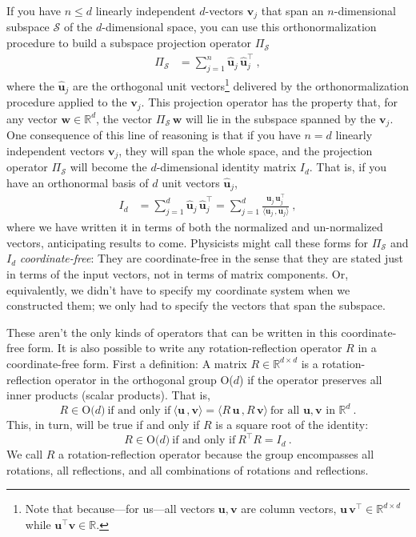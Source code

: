 \documentclass{article}
\newcommand{\Evec}[1]{{\mathbf{#1}}} %
\newcommand{\Ehat}[1]{{\mathbf{\hat{#1}}}} %
\newcommand{\inner}[2]{\langle{#1}\,,{#2}\rangle}
\begin{document}
If you have $n\leq d$ linearly independent $d$-vectors $\Evec{v}_j$ that span an $n$-dimensional subspace $\mathscr{S}$ of the $d$-dimensional space, you can use this orthonormalization procedure to build a subspace projection operator $\Pi_\mathscr{S}$
\begin{align}\label{eq:oproj}
    \Pi_\mathscr{S} &= \sum_{j=1}^n \Ehat{u}_j\,\Ehat{u}_j^\top ~,
\end{align}
where the $\Ehat{u}_j$ are the orthogonal unit vectors\footnote{Note that because---for us---all vectors $\Evec{u},\Evec{v}$ are column vectors, $\Evec{u}\,\Evec{v}^\top\in\mathbb{R}^{d\times d}$ while $\Evec{u}^\top \Evec{v}\in\mathbb{R}$.} delivered by the orthonormalization procedure applied to the $\Evec{v}_j$.
This projection operator has the property that, for any vector $\Evec{w}\in\mathbb{R}^d$, the vector $\Pi_\mathscr{S}\,\Evec{w}$ will lie in the subspace spanned by the $\Evec{v}_j$.
One consequence of this line of reasoning is that if you have $n=d$ linearly independent vectors $\Evec{v}_j$, they will span the whole space, and the projection operator $\Pi_\mathscr{S}$ will become the $d$-dimensional identity matrix $I_d$.
That is, if you have an orthonormal basis of $d$ unit vectors $\Ehat{u}_j$,
\begin{align}\label{eq:oI}
    I_d &= \sum_{j=1}^d \Ehat{u}_j\,\Ehat{u}_j^\top = \sum_{j=1}^d \frac{\Evec{u}_j\,\Evec{u}_j^\top}{\inner{\Evec{u}_j}{\Evec{u}_j}} ~,
\end{align}
where we have written it in terms of both the normalized and un-normalized vectors, anticipating results to come.
Physicists might call these forms for $\Pi_\mathscr{S}$ and $I_d$ \emph{coordinate-free}:
They are coordinate-free in the sense that they are stated just in terms of the input vectors, not in terms of matrix components.
Or, equivalently, we didn't have to specify my coordinate system when we constructed them; we only had to specify the vectors that span the subspace.

These aren't the only kinds of operators that can be written in this coordinate-free form.
It is also possible to write any rotation-reflection operator $R$ in a coordinate-free form.
First a definition: A matrix $R\in\mathbb{R}^{d\times d}$ is a rotation-reflection operator in the orthogonal group O($d$) if the operator preserves all inner products (scalar products).
That is,
\begin{equation}
    R \in \mbox{O($d$)} ~ \mbox{if and only if} ~ \inner{\Evec{u}}{\Evec{v}}=\inner{R\,\Evec{u}}{R\,\Evec{v}} ~ \mbox{for all $\Evec{u},\Evec{v}$ in $\mathbb{R}^d$} ~.\label{eq:orth1}
\end{equation}
This, in turn, will be true if and only if $R$ is a square root of the identity:
\begin{equation}
    R \in \mbox{O($d$)} ~ \mbox{if and only if} ~ R^\top R=I_d ~.\label{eq:orth2}
\end{equation}
We call $R$ a rotation-reflection operator because the group encompasses all rotations, all reflections, and all combinations of rotations and reflections.
\end{document}
